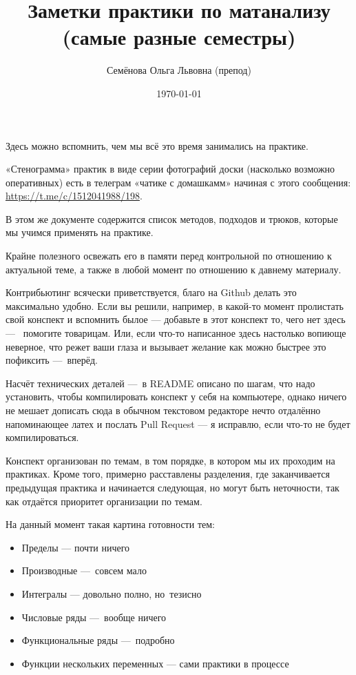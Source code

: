 \documentclass[12pt, a4paper]{article}
\title{Заметки практики по матанализу \\(самые разные семестры)}
\author{
  \vova
  \and
  {Семёнова Ольга Львовна (препод)}
}
\date{\today}
\begin{document}
  \tittoc


  Здесь можно вспомнить, чем мы всё это время занимались на практике.
  
  «Стенограмма» практик в виде серии фотографий доски (насколько возможно оперативных) есть в телеграм «чатике с домашкамм» начиная с этого сообщения:
  \url{https://t.me/c/1512041988/198}.

  В этом же документе содержится список методов, подходов и трюков,
  которые мы учимся применять на практике.

  Крайне полезного освежать его в памяти перед контрольной по отношению к актуальной теме, 
  а также в любой момент по отношению к давнему материалу.

  Контрибьютинг всячески приветствуется, 
  благо на Github делать это максимально удобно.
  Если вы решили, например, в какой-то момент 
  пролистать свой конспект и вспомнить былое — 
  добавьте в этот конспект то, чего нет здесь — 
  помогите товарицам. 
  Или, если что-то написанное здесь настолько вопиюще неверное, 
  что режет ваши глаза и вызывает желание как можно быстрее это пофиксить — вперёд.

  Насчёт технических деталей — в README описано по шагам, 
  что надо установить, чтобы компилировать конспект у себя на компьютере,
  однако ничего не мешает дописать сюда в обычном текстовом редакторе 
  нечто отдалённо напоминающее латех и послать Pull Request 
  — я исправлю, если что-то не будет компилироваться.


  Конспект организован по темам, в том порядке, в котором мы их проходим на практиках.
  Кроме того, примерно расставлены разделения, 
  где заканчивается предыдущая практика и начинается следующая,
  но могут быть неточности, так как отдаётся приоритет организации по темам.

  На данный момент такая картина готовности тем:

  \begin{itemize}
    \item Пределы — почти ничего
    \item Производные — совсем мало
    \item Интегралы — довольно полно, но тезисно
    \item Числовые ряды — вообще ничего
    \item Функциональные ряды — подробно
    \item Функции нескольких переменных — сами практики в процессе
  \end{itemize}
\end{document}
